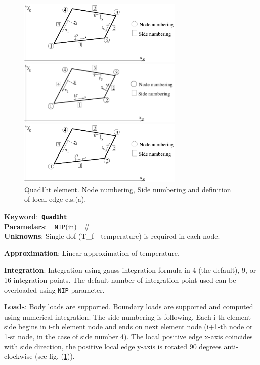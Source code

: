 \documentclass[a4paper]{article}
\newcommand{\descitem}[1]{{\noindent \bf #1}:}
\newcommand{\elemkeyword}[1]{\descitem{Keyword}~{\bf \texttt{#1}}}
\newcommand{\elemparam}[2]{{{\texttt{#1}\tiny (#2)}~~\#}}
\newcommand{\optelemparam}[2]{{[~\elemparam{#1}{#2}]}}
\newcommand{\param}[1]{{\texttt{#1}}}
\begin{document}
\begin{figure}[tb]
\begin{htmlonly}
  \centerline{\includegraphics[width=0.7\textwidth]{planestress2d.eps}}
\end{htmlonly}
\ifpdf
 \centerline{\includegraphics[width=0.7\textwidth]{planestress2d.pdf}}
\else
 \centerline{\includegraphics[width=0.7\textwidth]{planestress2d.eps}}
\fi
\caption{Quad1ht element. Node numbering, Side numbering and
definition of local edge c.s.(a).}
\label{Quad1htfig}
\end{figure}

\elemkeyword{Quad1ht}\\
\descitem{Parameters} \optelemparam{NIP}{in}\\
\descitem{Unknowns}
Single dof (T\_f - temperature) is required in each node.

\descitem{Approximation} Linear approximation of temperature.

\descitem{Integration}
Integration using gauss integration formula
in 4 (the default), 9, or 16 integration points. The default number of
integration point used can be overloaded using \param{NIP} parameter.

\descitem{Loads} Body loads are supported. Boundary loads are
supported and computed using numerical integration. The side numbering is
following. Each i-th element side begins in i-th element node and
ends on next element node (i+1-th node or 1-st node, in the case of 
side number 4). The local positive edge x-axis coincides with side
direction, the positive local edge y-axis is rotated 90 degrees
anti-clockwise (see fig. (\ref{Quad1htfig})).
\end{document}
